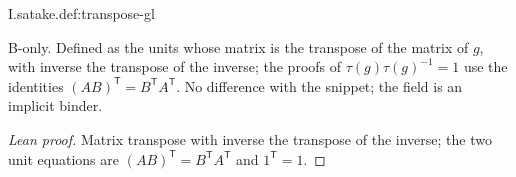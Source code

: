 \begin{definition}
\bonly
{}
\end{definition}
\begin{tfformal}{I.satake.def:transpose-gl}
\begin{tffidelity}
B-only. Defined as the units whose matrix is the transpose of the matrix of $g$, with inverse the transpose of the inverse; the proofs of $\tau(g)\tau(g)^{-1}=1$ use the identities $(AB)^{\mathsf T}=B^{\mathsf T}A^{\mathsf T}$. No difference with the snippet; the field is an implicit binder.
\end{tffidelity}
\end{tfformal}
\begin{proof}[Lean proof]
Matrix transpose with inverse the transpose of the inverse; the two unit equations are $(AB)^{\mathsf T}=B^{\mathsf T}A^{\mathsf T}$ and $1^{\mathsf T}=1$.
\end{proof}

